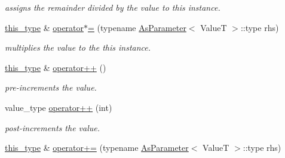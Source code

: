 \begin{DoxyCompactItemize}
\begin{DoxyCompactList}\small\item\em assigns the remainder divided by the value to this instance. \end{DoxyCompactList}\item 
\hypertarget{classhryky_1_1atomic_1_1_accessor_ac89441dac89a2df766761fdce1f5965b}{\hyperlink{classhryky_1_1atomic_1_1_accessor_a4957c9dc8163f5fb426f5eb8de5fcd12}{this\-\_\-type} \& \hyperlink{classhryky_1_1atomic_1_1_accessor_ac89441dac89a2df766761fdce1f5965b}{operator$\ast$=} (typename \hyperlink{classhryky_1_1_as_parameter}{As\-Parameter}$<$ Value\-T $>$\-::type rhs)}\label{classhryky_1_1atomic_1_1_accessor_ac89441dac89a2df766761fdce1f5965b}

\begin{DoxyCompactList}\small\item\em multiplies the value to the this instance. \end{DoxyCompactList}\item 
\hypertarget{classhryky_1_1atomic_1_1_accessor_a296692d35327be0e0bb002aa5c01d5d4}{\hyperlink{classhryky_1_1atomic_1_1_accessor_a4957c9dc8163f5fb426f5eb8de5fcd12}{this\-\_\-type} \& \hyperlink{classhryky_1_1atomic_1_1_accessor_a296692d35327be0e0bb002aa5c01d5d4}{operator++} ()}\label{classhryky_1_1atomic_1_1_accessor_a296692d35327be0e0bb002aa5c01d5d4}

\begin{DoxyCompactList}\small\item\em pre-\/increments the value. \end{DoxyCompactList}\item 
\hypertarget{classhryky_1_1atomic_1_1_accessor_a1fdc5c93dd8e8744697632a4ccd92b29}{value\-\_\-type \hyperlink{classhryky_1_1atomic_1_1_accessor_a1fdc5c93dd8e8744697632a4ccd92b29}{operator++} (int)}\label{classhryky_1_1atomic_1_1_accessor_a1fdc5c93dd8e8744697632a4ccd92b29}

\begin{DoxyCompactList}\small\item\em post-\/increments the value. \end{DoxyCompactList}\item 
\hypertarget{classhryky_1_1atomic_1_1_accessor_a4b216ebcbce3550f95dfc6b14179ada0}{\hyperlink{classhryky_1_1atomic_1_1_accessor_a4957c9dc8163f5fb426f5eb8de5fcd12}{this\-\_\-type} \& \hyperlink{classhryky_1_1atomic_1_1_accessor_a4b216ebcbce3550f95dfc6b14179ada0}{operator+=} (typename \hyperlink{classhryky_1_1_as_parameter}{As\-Parameter}$<$ Value\-T $>$\-::type rhs)}\label{classhryky_1_1atomic_1_1_accessor_a4b216ebcbce3550f95dfc6b14179ada0}


\end{DoxyCompactItemize}
